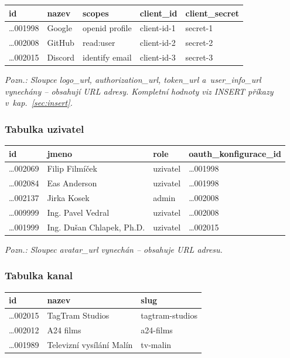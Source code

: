 \documentclass[12pt,a4paper]{article}
\begin{document}
{%
\small\centering
\begin{tabular}{|l|l|l|l|l|}
\hline
\textbf{id} & \textbf{nazev} & \textbf{scopes} & \textbf{client\_id} & \textbf{client\_secret} \\
\hline
…001998 & Google  & openid profile & client-id-1 & secret-1 \\
\hline
…002008 & GitHub  & read:user      & client-id-2 & secret-2 \\
\hline
…002015 & Discord & identify email & client-id-3 & secret-3 \\
\hline
\end{tabular}
\par}

\noindent\textit{Pozn.: Sloupce logo\_url, authorization\_url, token\_url a~user\_info\_url
vynechány -- obsahují URL adresy. Kompletní hodnoty viz INSERT příkazy v~kap.~\ref{sec:insert}.}

\subsubsection{Tabulka uzivatel}

{%
\small\centering
\begin{tabular}{|l|l|l|l|}
\hline
\textbf{id} & \textbf{jmeno} & \textbf{role} & \textbf{oauth\_konfigurace\_id} \\
\hline
…002069 & Filip Filmíček            & uzivatel & …001998 \\
\hline
…002084 & Eas Anderson              & uzivatel & …001998 \\
\hline
…002137 & Jirka Kosek               & admin    & …002008 \\
\hline
…009999 & Ing. Pavel Vedral         & uzivatel & …002008 \\
\hline
…001999 & Ing. Dušan Chlapek, Ph.D. & uzivatel & …002015 \\
\hline
\end{tabular}
\par}

\noindent\textit{Pozn.: Sloupec avatar\_url vynechán -- obsahuje URL adresu.}

\subsubsection{Tabulka kanal}

{%
\small\centering
\begin{tabular}{|l|l|l|}
\hline
\textbf{id} & \textbf{nazev} & \textbf{slug} \\
\hline
…002015 & TagTram Studios          & tagtram-studios \\
\hline
…002012 & A24 films                & a24-films \\
\hline
…001989 & Televizní vysílání Malín & tv-malin \\
\hline
\end{tabular}
\par}
\end{document}
